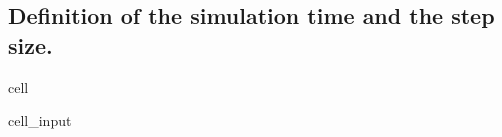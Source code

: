 \documentclass[letterpaper,10pt,english]{jupyterBook}
\begin{document}
\subsection{Definition of the simulation time and the step size.}
\label{\detokenize{Aufgabe1:definition-of-the-simulation-time-and-the-step-size}}
\begin{sphinxuseclass}{cell}\begin{sphinxVerbatimInput}

\begin{sphinxuseclass}{cell_input}
\begin{sphinxVerbatim}[commandchars=\\\{\}]
  
  
  
\end{sphinxVerbatim}

\end{sphinxuseclass}\end{sphinxVerbatimInput}

\end{sphinxuseclass}
\end{document}
